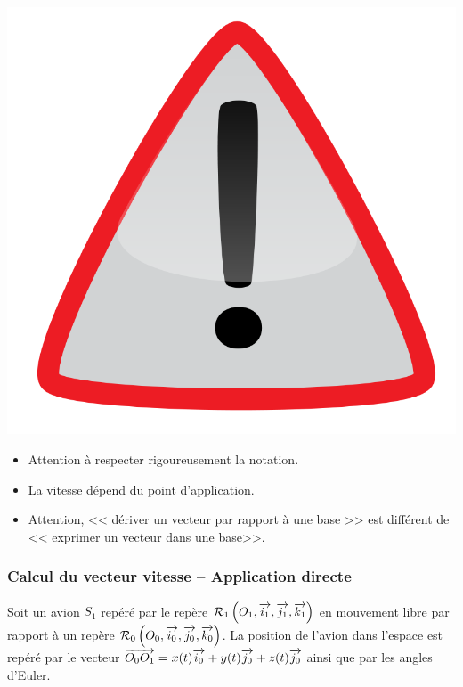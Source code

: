 \documentclass[10pt,oneside]{article}
\begin{document}
\begin{warn}
\begin{minipage}[c]{.15\linewidth}
\begin{center}
\includegraphics[width=.8\textwidth]{png/warning3}
\end{center}
\end{minipage} \hfill
\begin{minipage}[c]{.8\linewidth}
\begin{itemize}
\item Attention à respecter rigoureusement la notation.
\item La vitesse dépend du point d'application.
\item Attention, << dériver un vecteur par rapport à une base >> est différent de << exprimer un vecteur dans une base>>.
\end{itemize}
\end{minipage}
\end{warn}


\subsubsection{Calcul du vecteur vitesse -- Application directe}

Soit un avion $S_1$ repéré par le repère $\mathcal{R}_1\left(O_1,\overrightarrow{i_1},\overrightarrow{j_1},\overrightarrow{k_1} \right)$ en mouvement libre par rapport à un repère $\mathcal{R}_0\left(O_0,\overrightarrow{i_0},\overrightarrow{j_0},\overrightarrow{k_0} \right)$.  La position de l'avion dans l'espace est repéré par le vecteur $\overrightarrow{O_0O_1}=x(t)\overrightarrow{i_0}+y(t)\overrightarrow{j_0}+z(t)\overrightarrow{j_0}$ ainsi que par les angles d'Euler.
\end{document}
